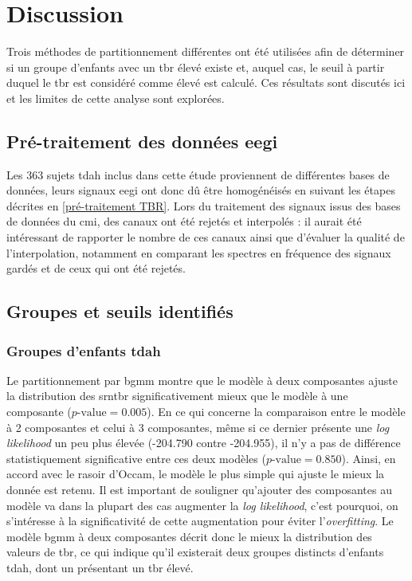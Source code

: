 \section{Discussion}

Trois méthodes de partitionnement différentes ont été utilisées afin de déterminer si un groupe d'enfants avec un \gls{tbr} élevé existe et, auquel cas, 
le seuil à partir duquel le \gls{tbr} est considéré comme élevé est calculé. Ces résultats sont discutés ici et les limites de cette analyse sont 
explorées.

\subsection{Pré-traitement des données \gls{eegi}}

Les 363 sujets \gls{tdah} inclus dans cette étude proviennent de différentes bases de données, leurs signaux \gls{eegi} ont donc dû être homogénéisés 
en suivant les étapes décrites en \ref{pré-traitement TBR}. Lors du traitement des signaux issus des bases de données du \gls{cmi}, des canaux ont 
été rejetés et interpolés : il aurait été intéressant de rapporter le nombre de ces canaux ainsi que d'évaluer la qualité de l'interpolation, notamment 
en comparant les spectres en fréquence des signaux gardés et de ceux qui ont été rejetés. 

\subsection{Groupes et seuils identifiés}

\subsubsection{Groupes d'enfants \gls{tdah}}

Le partitionnement par \gls{bgmm} montre que le modèle à deux composantes ajuste la distribution des \gls{srntbr} significativement mieux que le modèle
à une composante ($p\text{-value} = 0.005$). En ce qui concerne la comparaison entre le modèle à 2 composantes et celui à 3 composantes, même si ce dernier présente 
une \textit{log likelihood} un peu plus élevée (-204.790 contre -204.955), il n'y a pas de différence statistiquement significative entre ces deux modèles ($p\text{-value}
= 0.850$). Ainsi, en accord avec le rasoir d'Occam, le modèle le plus simple qui ajuste le mieux la donnée est retenu. Il est important de souligner
qu'ajouter des composantes au modèle va dans la plupart des cas augmenter la \textit{log likelihood}, c'est pourquoi, on s'intéresse à 
la significativité de cette augmentation pour éviter l'\textit{overfitting}. Le modèle \gls{bgmm} à deux composantes décrit donc le mieux la distribution
des valeurs de \gls{tbr}, ce qui indique qu'il existerait deux groupes distincts d'enfants \gls{tdah}, dont un présentant un \gls{tbr} élevé.

